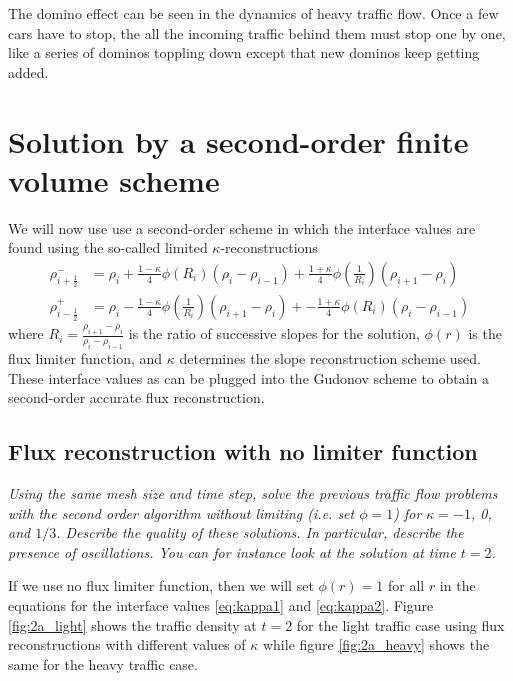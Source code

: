 \documentclass[11pt]{article}
\begin{document}
The domino effect can be seen in the dynamics of heavy traffic flow. Once a few cars have to stop, the all the incoming traffic behind them must stop one by one, like a series of dominos toppling down except that new dominos keep getting added.

\section{Solution by a second-order finite volume scheme}
We will now use use a second-order scheme in which the interface values are found using the so-called limited $\kappa$-reconstructions
\begin{align}
  \rho_{i+\frac{1}{2}}^- &= \rho_i
    + \frac{1-\kappa}{4} \phi(R_i) (\rho_i - \rho_{i-1})
    + \frac{1+\kappa}{4} \phi\left(\frac{1}{R_i}\right)(\rho_{i+1} - \rho_i) \label{eq:kappa1} \\
  \rho_{i-\frac{1}{2}}^+ &= \rho_i
    - \frac{1-\kappa}{4} \phi\left(\frac{1}{R_i}\right) (\rho_{i+1} - \rho_i)
    +- \frac{1+\kappa}{4} \phi(R_i) (\rho_i - \rho_{i-1}) \label{eq:kappa2}
\end{align}
where $\displaystyle R_i = \frac{\rho_{i+1} - \rho_i}{\rho_i - \rho_{i-1}}$ is the ratio of successive slopes for the solution, $\phi(r)$ is the flux limiter function, and $\kappa$ determines the slope reconstruction scheme used. These interface values as can be plugged into the Gudonov scheme to obtain a second-order accurate flux reconstruction.

\subsection{Flux reconstruction with no limiter function}
\begin{tcolorbox}
  \textit{Using the same mesh size and time step, solve the previous traffic flow problems with the second order algorithm without limiting (i.e. set $\phi = 1$) for $\kappa = -1$, 0, and $1/3$. Describe the quality of these solutions. In particular, describe the presence of oscillations. You can for instance look at the solution at time $t = 2$.}
\end{tcolorbox}

If we use no flux limiter function, then we will set $\phi(r) = 1$ for all $r$ in the equations for the interface values \eqref{eq:kappa1} and \eqref{eq:kappa2}. Figure \ref{fig:2a_light} shows the traffic density at $t=2$ for the light traffic case using flux reconstructions with different values of $\kappa$ while figure \ref{fig:2a_heavy} shows the same for the heavy traffic case.
\end{document}
